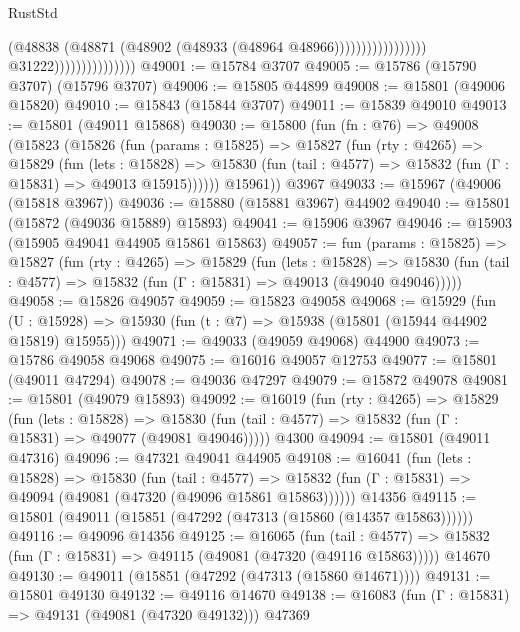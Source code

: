 \begin{lexlean}{RustStd}
\begin{coremodule}
                                                          (@48838
                                                            (@48871
                                                              (@48902
                                                                (@48933
                                                                  (@48964 @48966)))))))))))))))))
                                  @31222)))))))))))))))
@49001 := @15784 @3707
@49005 := @15786 (@15790 @3707) (@15796 @3707)
@49006 := @15805 @44899
@49008 := @15801 (@49006 @15820)
@49010 := @15843 (@15844 @3707)
@49011 := @15839 @49010
@49013 := @15801 (@49011 @15868)
@49030 := @15800
    (fun (fn : @76) =>
    @49008
      (@15823
        (@15826
          (fun (params : @15825) =>
          @15827
            (fun (rty : @4265) =>
            @15829
              (fun (lets : @15828) =>
              @15830 (fun (tail : @4577) => @15832 (fun (Γ : @15831) => @49013 @15915))))))
        @15961))
    @3967
@49033 := @15967 (@49006 (@15818 @3967))
@49036 := @15880 (@15881 @3967) @44902
@49040 := @15801 (@15872 (@49036 @15889) @15893)
@49041 := @15906 @3967
@49046 := @15903 (@15905 @49041 @44905 @15861 @15863)
@49057 := fun (params : @15825) =>
  @15827
    (fun (rty : @4265) =>
    @15829
      (fun (lets : @15828) =>
      @15830 (fun (tail : @4577) => @15832 (fun (Γ : @15831) => @49013 (@49040 @49046)))))
@49058 := @15826 @49057
@49059 := @15823 @49058
@49068 := @15929
    (fun (U : @15928) => @15930 (fun (t : @7) => @15938 (@15801 (@15944 @44902 @15819) @15955)))
@49071 := @49033 (@49059 @49068) @44900
@49073 := @15786 @49058 @49068
@49075 := @16016 @49057 @12753
@49077 := @15801 (@49011 @47294)
@49078 := @49036 @47297
@49079 := @15872 @49078
@49081 := @15801 (@49079 @15893)
@49092 := @16019
    (fun (rty : @4265) =>
    @15829
      (fun (lets : @15828) =>
      @15830 (fun (tail : @4577) => @15832 (fun (Γ : @15831) => @49077 (@49081 @49046)))))
    @4300
@49094 := @15801 (@49011 @47316)
@49096 := @47321 @49041 @44905
@49108 := @16041
    (fun (lets : @15828) =>
    @15830
      (fun (tail : @4577) =>
      @15832 (fun (Γ : @15831) => @49094 (@49081 (@47320 (@49096 @15861 @15863))))))
    @14356
@49115 := @15801 (@49011 (@15851 (@47292 (@47313 (@15860 (@14357 @15863))))))
@49116 := @49096 @14356
@49125 := @16065
    (fun (tail : @4577) => @15832 (fun (Γ : @15831) => @49115 (@49081 (@47320 (@49116 @15863)))))
    @14670
@49130 := @49011 (@15851 (@47292 (@47313 (@15860 @14671))))
@49131 := @15801 @49130
@49132 := @49116 @14670
@49138 := @16083 (fun (Γ : @15831) => @49131 (@49081 (@47320 @49132))) @47369

\end{coremodule}
\end{lexlean}
